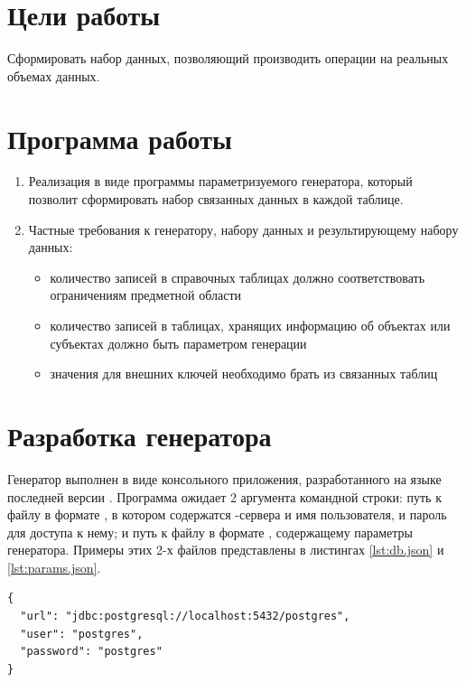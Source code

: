 





\tableofcontents
\newpage

\section{Цели работы}

Сформировать набор данных, позволяющий производить операции на реальных объемах данных. 

\section{Программа работы}

\begin{enumerate}
	\item Реализация в виде программы параметризуемого генератора, который позволит сформировать набор связанных данных в каждой таблице.
	\item Частные требования к генератору, набору данных и результирующему набору данных:
	\begin{itemize}
		\item количество записей в справочных таблицах должно соответствовать ограничениям предметной области
		\item количество записей в таблицах, хранящих информацию об объектах или субъектах должно быть параметром генерации
		\item значения для внешних ключей необходимо брать из связанных таблиц
	\end{itemize}
 
\end{enumerate}
 
\section{Разработка генератора} 

Генератор выполнен в виде консольного приложения, разработанного на языке  последней версии . Программа ожидает 2 аргумента командной строки: путь к файлу в формате , в котором содержатся  -сервера и имя пользователя, и пароль для доступа к нему; и путь к файлу в формате , содержащему параметры генератора. Примеры этих 2-х файлов представлены в листингах \ref{lst:db.json} и \ref{lst:params.json}.

\begin{lstlisting}[label={lst:db.json},caption={Пример параметров доступа к \code{Postgres}-серверу}]
{
  "url": "jdbc:postgresql://localhost:5432/postgres",
  "user": "postgres",
  "password": "postgres"
}
\end{lstlisting}

